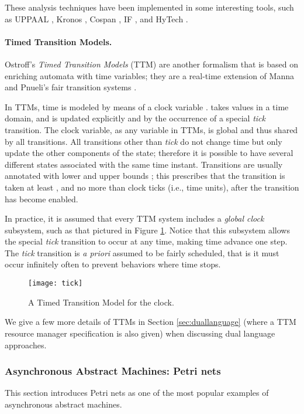 These analysis techniques have been implemented in some interesting 
tools, such as UPPAAL \cite{LPY97}, Kronos \cite{Yov97}, Cospan \cite{AK95}, IF \cite{BGOOS04}, and HyTech \cite{HHW97}.


\paragraph{Timed Transition Models.}
Ostroff's \emph{Timed Transition Models} (TTM) \linebreak \cite{Ost90} are another 
formalism that is based on enriching automata with time variables; 
they are a real-time  extension of Manna and Pnueli's fair transition 
systems \cite{MP92}.

In TTMs, time is modeled  by means of a clock variable .
 takes values in a  time domain, and is updated explicitly 
and  by the occurrence of a special \emph{tick} transition. The clock 
variable, as any variable in TTMs, is global and thus shared 
by all transitions. All transitions other than \emph{tick} do not 
change time but only update the other components of the state; 
therefore it is possible to have several different states associated 
with the same time instant. Transitions are usually annotated 
with lower and upper bounds ; this prescribes that 
the transition is taken at least , and no more than 
clock ticks (i.e., time units), after the transition has become 
enabled.

In practice, it is assumed that every TTM system includes a \emph{global clock}
subsystem, such as that pictured in Figure \ref{fig:tick}. Notice that 
this subsystem allows the special \emph{tick} transition to occur 
at any time, making time advance one step. The \emph{tick} transition 
is \emph{a priori} assumed to be fairly scheduled, that is it must 
occur infinitely often to prevent  behaviors where time stops. 
\begin{figure}[htb!]
	 \centering
	 \texttt{[image: tick]}
	 \caption{A Timed Transition Model for the clock.}
	 \label{fig:tick}
\end{figure}

We give a few more details of TTMs in Section \ref{sec:duallanguage} (where a TTM 
resource manager specification is also given) when discussing 
dual language approaches.


\subsubsection{Asynchronous Abstract Machines: Petri nets} \label{sec:petrinets}
This section introduces Petri nets as one of the most popular 
examples of asynchronous abstract machines.

